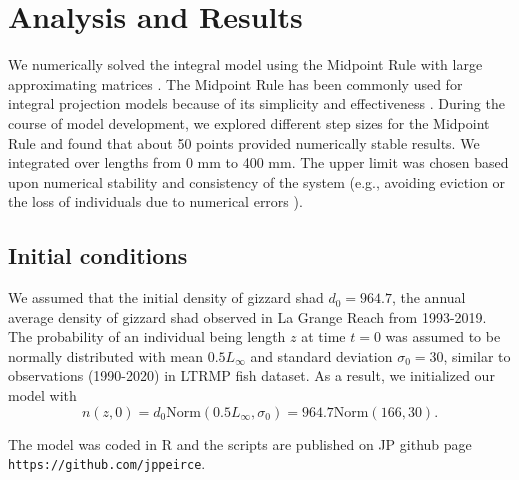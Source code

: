 \documentclass[preprint,review,12pt,authoryear]{elsarticle}
\begin{document}
\section{Analysis and Results}
We numerically solved the integral model using the Midpoint Rule with large approximating matrices \citep{burden2005numerical}. 
The Midpoint Rule has been commonly used for integral projection models because of its simplicity and effectiveness \citep{ellner2006integral, ramula2009integral,  merow2014advancing}. 
During the course of model development, we explored different step sizes for the Midpoint Rule and found that about 50 points provided numerically stable results. 
We integrated over lengths from 0 mm to 400 mm. 
The upper limit was chosen based upon numerical stability and consistency of the system (e.g., avoiding eviction or the loss of individuals due to numerical errors \citep{williams2012avoiding}). 

\subsection{Initial conditions}  We assumed that the initial density of gizzard shad $d_0 = 964.7$, the annual average density of gizzard shad observed in La Grange Reach from 1993-2019.  
The probability of an individual being length $z$ at time $t=0$  was assumed to be normally distributed with mean $0.5L_\infty$ and standard deviation $\sigma_0 = 30$, similar to observations (1990-2020) in LTRMP fish dataset.  
As a result, we initialized our model with
\begin{equation}\label{eq:n}
 n(z,0) = d_0 \mbox{Norm} (0.5 L_\infty, \sigma_0) = 964.7 \mbox{Norm} (166, 30). 
 \end{equation}

The model was coded in R \citep{R} and the scripts are published on JP github page \verb+https://github.com/jppeirce+.
\end{document}

